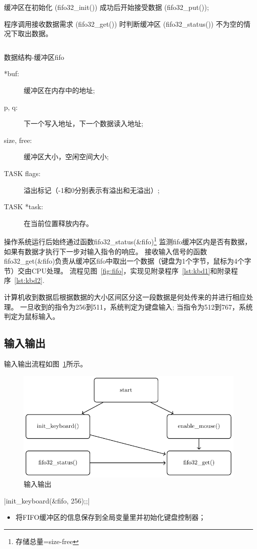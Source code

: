 缓冲区在初始化 (fifo32\_init()) 成功后开始接受数据 (fifo32\_put());

程序调用接收数据需求 (fifo32\_get()) 时判断缓冲区 (fifo32\_status()) 不为空的情况下取出数据。
\begin{listing}[H]
  \inputminted[tabsize=2, firstline=40, lastline=44,
    linenos=true]{c}{../ZOS/src/kernel/bootpack.h}
  \caption{数据结构-缓冲区fifo}
  \label{lst:fifo}
\end{listing}
\begin{description}
\item[*buf:]缓冲区在内存中的地址;
\item[p, q:]下一个写入地址，下一个数据读入地址;
\item[size, free:]缓冲区大小，空闲空间大小;
\item[TASK flags:]溢出标记（-1和0分别表示有溢出和无溢出）;
\item[TASK *task:]在当前位置释放内存。
\end{description}

操作系统运行后始终通过函数fifo32\_status(\&fifo)\footnote{存储总量=size-free}
监测fifo缓冲区内是否有数据，如果有数据才执行下一步对输入指令的响应。
接收输入信号的函数fifo32\_get(\&fifo)负责从缓冲区fifo中取出一个数据（键盘为1个字节，鼠标为4个字节）交由CPU处理。
流程见图~\ref{fig:fifo}，实现见附录程序~\ref{lst:kbd1}和附录程序~\ref{lst:kbd2}.

计算机收到数据后根据数据的大小区间区分这一段数据是何处传来的并进行相应处理。
一旦收到的指令为256到511，系统判定为键盘输入;
当指令为512到767，系统判定为鼠标输入。

\newpage
\subsection{输入输出}

输入输出流程如图~\ref{fig:io}所示。
\begin{figure}[H]
  \centering
  \includegraphics[width=.5\textwidth]{fig/func/io.pdf}
  \caption{输入输出}
  \label{fig:io}
\end{figure}

\csingle|init_keyboard(&fifo, 256);;|
\begin{itemize}
  \item 将FIFO缓冲区的信息保存到全局变量里并初始化键盘控制器；
\end{itemize}

